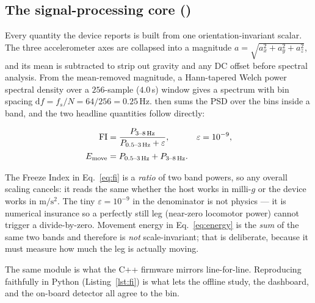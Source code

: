 \subsection{The signal-processing core ()}

Every quantity the device reports is built from one orientation-invariant scalar. The
three accelerometer axes are collapsed into a magnitude
$a=\sqrt{a_x^2+a_y^2+a_z^2}$, and its mean is subtracted to strip out gravity and any
DC offset before spectral analysis. From the mean-removed magnitude, a Hann-tapered
Welch power spectral density over a $256$-sample ($4.0$\,s) window gives a spectrum
with bin spacing $\mathrm{d}f=f_s/N=64/256=0.25$\,Hz.  then sums the
PSD over the bins inside a band, and the two headline quantities follow directly:

\begin{align}
\mathrm{FI} &= \frac{P_{3\text{--}8\,\mathrm{Hz}}}{P_{0.5\text{--}3\,\mathrm{Hz}}+\varepsilon},
  &\varepsilon &= 10^{-9},
  \label{eq:fi}\\[2pt]
E_{\text{move}} &= P_{0.5\text{--}3\,\mathrm{Hz}} + P_{3\text{--}8\,\mathrm{Hz}}.
  \label{eq:energy}
\end{align}

\begin{mathsbox}
The Freeze Index in Eq.~\eqref{eq:fi} is a \emph{ratio} of two band powers, so any
overall scaling cancels: it reads the same whether the host works in milli-$g$ or the
device works in $\mathrm{m/s^2}$. The tiny $\varepsilon=10^{-9}$ in the denominator is
not physics --- it is numerical insurance so a perfectly still leg (near-zero
locomotor power) cannot trigger a divide-by-zero. Movement energy in
Eq.~\eqref{eq:energy} is the \emph{sum} of the same two bands and therefore is
\emph{not} scale-invariant; that is deliberate, because it must measure how much the
leg is actually moving.
\end{mathsbox}

The same  module is what the C++ firmware mirrors line-for-line. Reproducing
 faithfully in Python (Listing~\ref{lst:fi}) is what lets the offline
study, the dashboard, and the on-board detector all agree to the bin.


